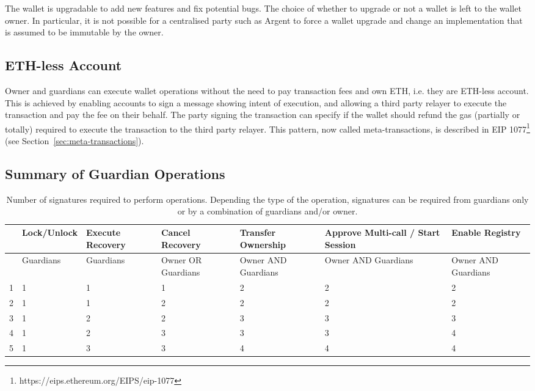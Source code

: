 \documentclass[12pt]{article}
\begin{document}
The wallet is upgradable to add new features and fix potential bugs. The choice of whether to upgrade or not a wallet is left to the wallet owner. In particular, it is not possible for a centralised party such as Argent to force a wallet upgrade and change an implementation that is assumed to be immutable by the owner.

\subsection{ETH-less Account}
\label{sec:eth-less-account}

Owner and guardians can execute wallet operations without the need to pay transaction fees and own ETH, i.e. they are ETH-less account. This is achieved by enabling accounts to sign a message showing intent of execution, and allowing a third party relayer to execute the transaction and pay the fee on their behalf. The party signing the transaction can specify if the wallet should refund the gas (partially or totally) required to execute the transaction to the third party relayer. This pattern, now called meta-transactions, is described in EIP 1077\footnote{https://eips.ethereum.org/EIPS/eip-1077} (see Section~\ref{sec:meta-transactions}). 

\subsection{Summary of Guardian Operations}
\begin{table}[ht]
    \begin{tabular}{ |c|m{5em}|m{5em}|m{5em}|m{5em}|m{5em}|m{5em}| }
     \hline
       & Lock/Unlock & Execute \newline Recovery & Cancel  \newline Recovery & Transfer Ownership & Approve Multi-call / Start Session & Enable Registry \\
     \hline \hline
       & Guardians & Guardians & Owner OR Guardians & Owner AND Guardians & Owner AND Guardians & Owner AND Guardians \\
     \hline
     1 & 1 & 1 & 1 & 2 & 2 & 2 \\
     2 & 1 & 1 & 2 & 2 & 2 & 2\\
     3 & 1 & 2 & 2 & 3 & 3 & 3\\
     4 & 1 & 2 & 3 & 3 & 3 & 4\\
     5 & 1 & 3 & 3 & 4 & 4 & 4\\
     \hline

    \end{tabular}
    \caption{Number of signatures required to perform operations. Depending the type of the operation, signatures can be required from guardians only or by a combination of guardians and/or owner.}
\end{table}
\end{document}
